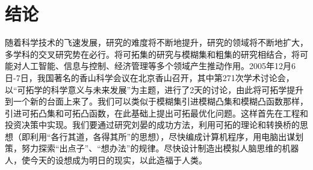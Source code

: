 \section{结论}
随着科学技术的飞速发展，研究的难度将不断地提升，研究的领域将不断地扩大，多学科的交叉研究势在必行。将可拓集的研究与模糊集和粗集的研究相结合，将可能对人工智能、信息与控制、经济管理等多个领域产生推动作用。2005年12月6 日-7日，我国著名的香山科学会议在北京香山召开，其中第271次学术讨论会，以“可拓学的科学意义与未来发展”为主题，进行了2天的讨论，由此将可拓学提升到一个新的台面上来了。我们可以类似于模糊集引进模糊凸集和模糊凸函数那样\cite{ref07}，引进可拓凸集和可拓凸函数\cite{ref05}\cite{ref06}，在此基础上提出可拓最优化问题。这样首先在工程和投资决策中实现\cite{ref03}\cite{ref04}。我们要通过研究刘晏的成功方法，利用可拓的理论和转换桥的思想（即利用“各行其道，各得其所”的思想），尽快编成计算机程序，用电脑出谋划策，努力探索“出点子”、“想办法”的规律。尽快设计制造出模拟人脑思维的机器人，使今天的设想成为明日的现实，以此造福于人类。
